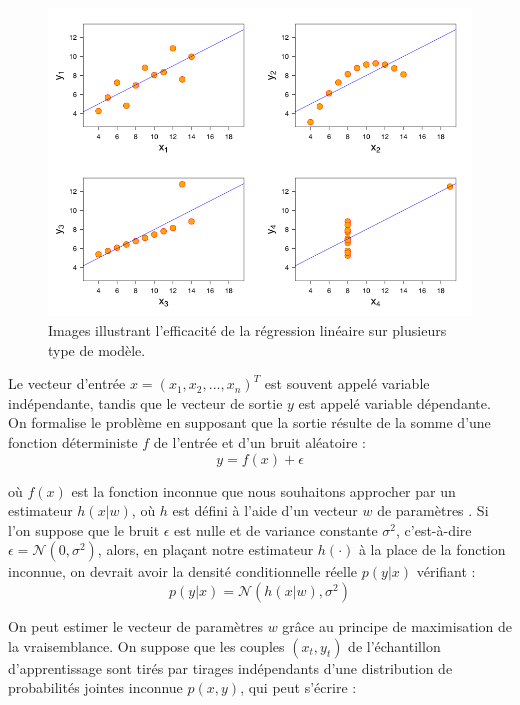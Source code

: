 \begin{figure}[hth]%
	\centering
	\includegraphics[width=\textwidth]{images/linear_regression_quartet.png}
	\caption{Images illustrant l'efficacité de la régression linéaire sur plusieurs type de modèle.}
	\label{fig:linear_regression_quartet}
\end{figure}

Le vecteur d'entrée $x = (x_1,x_2,...,x_n)^T$ est souvent appelé variable indépendante, tandis que le vecteur de sortie $y$ est appelé variable dépendante. On formalise le problème en supposant que la sortie résulte de la somme d'une fonction déterministe $f$ de l'entrée et d'un bruit aléatoire :
\begin{equation}
y = f(x) + \epsilon
\end{equation}

où $f(x)$ est la fonction inconnue que nous souhaitons approcher par un estimateur $h(x|w)$, où $h$ est défini à l'aide d'un vecteur $w$ de paramètres \cite{alpaydin2010introduction}.
Si l'on suppose que le bruit $\epsilon$ est nulle et de variance constante $\sigma^2$, c'est-à-dire $ \epsilon = \mathcal{N}(0,\sigma^2)$, alors, en plaçant notre estimateur $h(\cdot)$ à la place de la fonction inconnue, on devrait avoir la densité conditionnelle réelle $p(y|x)$ vérifiant :
\begin{equation}
p(y|x) = \mathcal{N}(h(x|w),\sigma^2)
\end{equation}

On peut estimer le vecteur de paramètres $w$ grâce au principe de maximisation de la vraisemblance. On suppose que les couples $(x_t, y_t)$ de l'échantillon d'apprentissage sont tirés par tirages indépendants d'une distribution de probabilités jointes inconnue $p(x, y)$, qui peut s'écrire :

